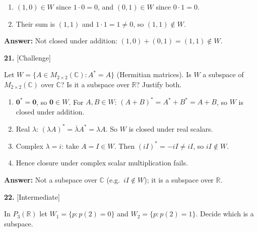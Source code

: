 \documentclass[11pt]{article}
\begin{document}
\begin{tcolorbox}[breakable,colback=ans,colframe=ansb,boxrule=0.5pt,left=4pt,right=4pt,top=2pt,bottom=2pt]\begin{enumerate}[leftmargin=2.2em,itemsep=1pt,topsep=1pt,label=\textbf{Step \arabic*.}]\item $(1,0)\in W$ since $1\cdot0=0$, and $(0,1)\in W$ since $0\cdot1=0$.
\item Their sum is $(1,1)$ and $1\cdot1=1\neq0$, so $(1,1)\notin W$.
\end{enumerate}\textbf{Answer:} Not closed under addition: $(1,0)+(0,1)=(1,1)\notin W$.\end{tcolorbox}
\par\vspace{2pt}
\begin{minipage}{\linewidth}\textbf{21.} \hfill{\scriptsize\color{ink}[Challenge]}\par\nopagebreak Let $W=\{A\in M_{2\times2}(\mathbb{C}):A^{*}=A\}$ (Hermitian matrices). Is $W$ a subspace of $M_{2\times2}(\mathbb{C})$ over $\mathbb{C}$? Is it a subspace over $\mathbb{R}$? Justify both.
\end{minipage}\par\nopagebreak
\begin{tcolorbox}[breakable,colback=ans,colframe=ansb,boxrule=0.5pt,left=4pt,right=4pt,top=2pt,bottom=2pt]\begin{enumerate}[leftmargin=2.2em,itemsep=1pt,topsep=1pt,label=\textbf{Step \arabic*.}]\item $\mathbf 0^{*}=\mathbf 0$, so $\mathbf 0\in W$. For $A,B\in W$: $(A+B)^{*}=A^{*}+B^{*}=A+B$, so $W$ is closed under addition.
\item Real $\lambda$: $(\lambda A)^{*}=\overline{\lambda}A^{*}=\lambda A$. So $W$ is closed under real scalars.
\item Complex $\lambda=i$: take $A=I\in W$. Then $(iI)^{*}=-iI\neq iI$, so $iI\notin W$.
\item Hence closure under complex scalar multiplication fails.
\end{enumerate}\textbf{Answer:} Not a subspace over $\mathbb{C}$ (e.g.\ $iI\notin W$); it is a subspace over $\mathbb{R}$.\end{tcolorbox}
\par\vspace{2pt}
\begin{minipage}{\linewidth}\textbf{22.} \hfill{\scriptsize\color{ink}[Intermediate]}\par\nopagebreak In $P_{3}(\mathbb{R})$ let $W_1=\{p: p(2)=0\}$ and $W_2=\{p: p(2)=1\}$. Decide which is a subspace.
\end{minipage}\par\nopagebreak
\end{document}
